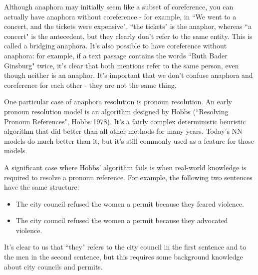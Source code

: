 Although anaphora may initially seem like a subset of coreference, you can actually have anaphora without coreference - for example, in ``We went to a concert, and the tickets were expensive", ``the tickets" is the anaphor, whereas ``a concert" is the antecedent, but they clearly don't refer to the same entity. This is called a bridging anaphora. It's also possible to have coreference without anaphora: for example, if a text passage contains the words ``Ruth Bader Ginsburg" twice, it's clear that both mentions refer to the same person, even though neither is an anaphor. It's important that we don't confuse anaphora and coreference for each other - they are not the same thing.

One particular case of anaphora resolution is pronoun resolution. An early pronoun resolution model is an algorithm designed by Hobbs (``Resolving Pronoun References", Hobbs 1978). It's a fairly complex deterministic heuristic algorithm that did better than all other methods for many years. Today's NN models do much better than it, but it's still commonly used as a feature for those models.

A significant case where Hobbs' algorithm fails is when real-world knowledge is required to resolve a pronoun reference. For example, the following two sentences have the same structure:
\begin{itemize}
\item The city council refused the women a permit because they feared violence.
\item The city council refused the women a permit because they advocated violence.
\end{itemize}
It's clear to us that ``they" refers to the city council in the first sentence and to the men in the second sentence, but this requires some background knowledge about city councils and permits.


